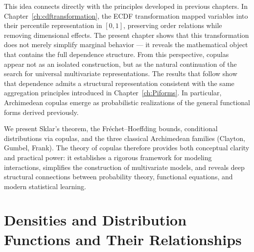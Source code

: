 This idea connects directly with the principles developed in previous chapters. In Chapter~\ref{ch:cdftransformation}, the ECDF transformation mapped variables into their percentile representation in $[0,1]$, preserving order relations while removing dimensional effects. The present chapter shows that this transformation does not merely simplify marginal behavior — it reveals the mathematical object that contains the full dependence structure. From this perspective, copulas appear not as an isolated construction, but as the natural continuation of the search for universal multivariate representations. The results that follow show that dependence admits a structural representation consistent with the same aggregation principles introduced in Chapter~\ref{ch:Piforms}. In particular, Archimedean copulas emerge as probabilistic realizations of the general functional forms derived previously.

We present Sklar's theorem, the Fréchet–Hoeffding bounds, conditional distributions via copulas, and the three classical Archimedean families (Clayton, Gumbel, Frank). The theory of copulas therefore provides both conceptual clarity and practical power: it establishes a rigorous framework for modeling interactions, simplifies the construction of multivariate models, and reveals deep structural connections between probability theory, functional equations, and modern statistical learning.

\section{Densities and Distribution Functions and Their Relationships}\label{sec:distributions}
